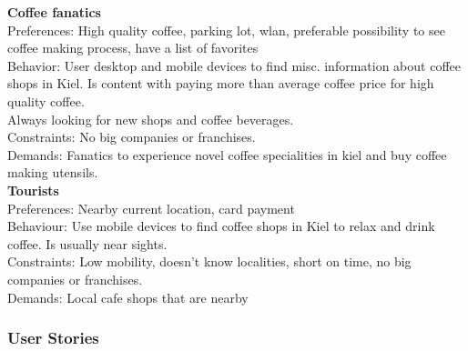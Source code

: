 \textbf{Coffee fanatics}\\
Preferences: High quality coffee, parking lot, wlan, preferable possibility to see coffee making process, have a list of favorites  \\
Behavior: User desktop and mobile devices to find misc. information about coffee shops in Kiel. Is content with paying more than average coffee price for high quality coffee.\\
                 Always looking for new shops and coffee beverages. \\
Constraints: No big companies or franchises. \\
Demands: Fanatics to experience novel coffee specialities in kiel and buy coffee making utensils.\\
\newpage
\textbf{Tourists}\\
Preferences: Nearby current location, card payment \\
Behaviour: Use mobile devices to find coffee shops in Kiel to relax and drink coffee. Is usually near sights. \\
Constraints: Low mobility, doesn't know localities, short on time, no big companies or franchises. \\
Demands: Local cafe shops that are nearby\\

\subsubsection{User Stories}

